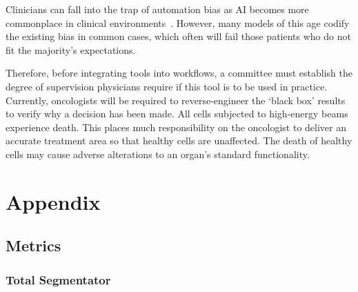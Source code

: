 \documentclass[11pt,twoside]{report}
\begin{document}
Clinicians can fall into the trap of automation bias as AI becomes more commonplace in clinical environments~\cite{STRAW2020101965}. However, many models of this age codify the existing bias in common cases, which often will fail those patients who do not fit the majority's expectations. 

Therefore, before integrating tools into workflows, a committee must establish the degree of supervision physicians require if this tool is to be used in practice. Currently, oncologists will be required to reverse-engineer the `black box' results to verify why a decision has been made. All cells subjected to high-energy beams experience death. This places much responsibility on the oncologist to deliver an accurate treatment area so that healthy cells are unaffected. The death of healthy cells may cause adverse alterations to an organ's standard functionality.





\clearpage

\appendix

\chapter{Appendix}

\section{Metrics}

\subsection{Total Segmentator}\label{sect:totalsegmentator-appendix}
\end{document}
